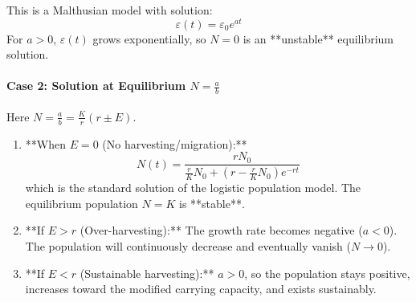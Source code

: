 This is a Malthusian model with solution:
\begin{equation*}
\varepsilon(t) = \varepsilon_0 e^{at}
\end{equation*}
For $a > 0$, $\varepsilon(t)$ grows exponentially, so $N = 0$ is an **unstable** equilibrium solution.

\paragraph{Case 2: Solution at Equilibrium $N = \frac{a}{b}$}
Here $N = \frac{a}{b} = \frac{K}{r}(r \pm E)$.

\begin{enumerate}
    \item **When $E = 0$ (No harvesting/migration):**
    \begin{equation*}
    N(t) = \frac{r N_0}{\frac{r}{K} N_0 + \left( r - \frac{r}{K} N_0 \right) e^{-rt}}
    \end{equation*}
    which is the standard solution of the logistic population model. The equilibrium population $N = K$ is **stable**.

    \item **If $E > r$ (Over-harvesting):**
    The growth rate becomes negative ($a < 0$). The population will continuously decrease and eventually vanish ($N \to 0$).

    \item **If $E < r$ (Sustainable harvesting):**
    $a > 0$, so the population stays positive, increases toward the modified carrying capacity, and exists sustainably.
\end{enumerate}